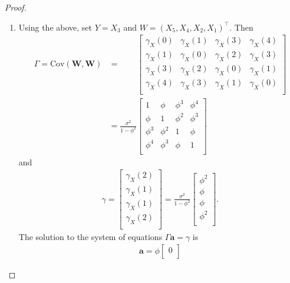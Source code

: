 \documentclass[12pt]{article}
\theoremstyle{definition}
\newcommand{\Co}[2]{\text{Cov}\left({#1}, {#2}\right)}
\newcommand{\vect}[1]{\boldsymbol{#1}}
\begin{document}
\begin{proof}
\begin{enumerate}
    \item Using the above, set $Y = X_3$ and $W = (X_5, X_4, X_2, X_1)^\intercal$. Then
      \begin{align*}
        \Gamma = \Co{\vect{W}}{\vect{W}} &=
        \phantom{\frac{\sigma^2}{1-\phi^2} }
        \begin{bmatrix}
          \gamma_X(0) & \gamma_X(1) & \gamma_X(3) & \gamma_X(4) \\
          \gamma_X(1) & \gamma_X(0) & \gamma_X(2) & \gamma_X(3) \\
          \gamma_X(3) & \gamma_X(2) & \gamma_X(0) & \gamma_X(1) \\
          \gamma_X(4) & \gamma_X(3) & \gamma_X(1) & \gamma_X(0) \\
        \end{bmatrix}\\
        &=
        \frac{\sigma^2}{1-\phi^2}
        \begin{bmatrix}
          1 & \phi & \phi^3 & \phi^4 \\
          \phi & 1  & \phi^2 & \phi^3 \\
          \phi^3 & \phi^2 & 1  & \phi \\
          \phi^4 & \phi^3 & \phi & 1 \\
        \end{bmatrix}
      \end{align*}
      and
      \begin{align*}
        \gamma =
        \begin{bmatrix}
          \gamma_X(2) \\
          \gamma_X(1) \\
          \gamma_X(1) \\
          \gamma_X(2) \\
        \end{bmatrix}
        = \frac{\sigma^2}{1-\phi^2}
        \begin{bmatrix}
          \phi^2 \\
          \phi \\
          \phi \\
          \phi^2 \\
        \end{bmatrix}.
      \end{align*}
      The solution to the system of equations $\Gamma \vect{a} = \gamma$ is
      \begin{align*}
        \vect{a} = \phi
        \begin{bmatrix}
          0 \\

\end{bmatrix}
\end{align*}
\end{enumerate}
\end{proof}
\end{document}
